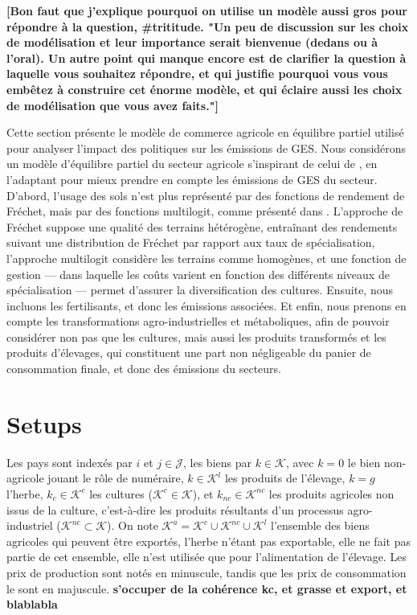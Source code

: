 \textbf{[Bon faut que j'explique pourquoi on utilise un modèle aussi gros pour répondre à la question, \#trititude. "Un peu de discussion sur les choix de modélisation et leur importance serait bienvenue (dedans ou à l'oral). Un autre point qui manque encore est de clarifier la question à laquelle vous souhaitez répondre, et qui justifie pourquoi vous vous embêtez à construire cet énorme modèle, et qui éclaire aussi les choix de modélisation que vous avez faits."]}

Cette section présente le modèle de commerce agricole en équilibre partiel utilisé pour analyser l’impact des politiques sur les émissions de GES. Nous considérons un modèle d'équilibre partiel du secteur agricole s'inspirant de celui de \cite{Gouel2021}, en l'adaptant pour mieux prendre en compte les émissions de GES du secteur. D'abord, l'usage des sols n'est plus représenté par des fonctions de rendement de Fréchet, mais par des fonctions multilogit, comme présenté dans \cite{Gouel202x}. L’approche de Fréchet suppose une qualité des terrains hétérogène, entraînant des rendements suivant une distribution de Fréchet par rapport aux taux de spécialisation, l’approche multilogit considère les terrains comme homogènes, et une fonction de gestion — dans laquelle les coûts varient en fonction des différents niveaux de spécialisation — permet d'assurer la diversification des cultures. Ensuite, nous incluons les fertilisants, et donc les émissions associées. Et enfin, nous prenons en compte les transformations agro-industrielles et métaboliques, afin de pouvoir considérer non pas que les cultures, mais aussi les produits transformés et les produits d'élevages, qui constituent une part non négligeable du panier de consommation finale, et donc des émissions du secteurs.


\section{Setups}

Les pays sont indexés par $i$ et $j \in \mathcal{J}$, les biens par $k \in \mathcal{K}$, avec $k=0$ le bien non-agricole jouant le rôle de numéraire, $k \in \mathcal{K}^l$ les produits de l’élevage, $k = g$ l’herbe, $k_c \in \mathcal{K}^c$ les cultures ($\mathcal{K}^c \in \mathcal{K}$), et $k_{nc} \in \mathcal{K}^{nc}$ les produits agricoles non issus de la culture, c’est-à-dire les produits résultants d’un processus agro-industriel ($\mathcal{K}^{nc} \subset \mathcal{K}$). On note $\mathcal{K}^a = \mathcal{K}^c \cup \mathcal{K}^{nc} \cup \mathcal{K}^l$ l’ensemble des biens agricoles qui peuvent être exportés, l’herbe n’étant pas exportable, elle ne fait pas partie de cet ensemble, elle n’est utilisée que pour l’alimentation de l’élevage. Les prix de production sont notés en minuscule, tandis que les prix de consommation le sont en majuscule. \textbf{s'occuper de la cohérence kc, et grasse et export, et blablabla}


